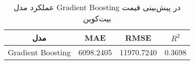 
        \begin{table}[h]
            \centering
            \begin{tabular}{cccc}
                \toprule
                \textbf{مدل} & \textbf{MAE} & \textbf{RMSE} & \textbf{ \(R^2\) } \\
                \midrule
                Gradient Boosting & 6098.2405 & 11970.7240 & 0.3698 \\
                \bottomrule
            \end{tabular}
            \caption{عملکرد مدل Gradient Boosting در پیش‌بینی قیمت بیت‌کوین}
            \label{tab:gradient_boosting_performance}
        \end{table}
        